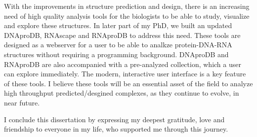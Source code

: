 With the improvements in structure prediction and design, there is an increasing need of high quality analysis tools for the biologists to be able to study, visualize and explore these structures. In later part of my PhD, we built an updated DNAproDB, RNAscape \citep{Mitra2024rnascape} and RNAproDB to address this need. These tools are designed as a webserver for a user to be able to analkze protein-DNA-RNA structures without requiring a programming background. DNAproDB and RNAproDB are also accompanied with a pre-analyzed collection, which a user can explore immediately. The modern, interactive user interface is a key feature of these tools. I believe these tools will be an essential asset of the field to analyze high throughput predicted/desgined complexes, as they continue to evolve, in near future. 

I conclude this dissertation by expressing my deepest gratitude, love and friendship to everyone in my life, who supported me through this journey.
